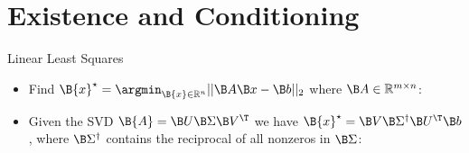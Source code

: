 
%

\subtitle{Linear Least Squares}
\date{}


\begin{frame}
  \titlepage
\end{frame}

\section{Existence and Conditioning}

\begin{frame}[fragile]{Linear Least Squares}
\begin{itemize}
\item Find $\B{x}^\star= \argmin_{\B{x}\in\mathbb{R}^{n}}||\B A \B x - \B b||_2$ where $\B A \in\mathbb{R}^{m\times n}$:


\item Given the SVD $\B{A}=\B U \B \Sigma \B V^\T$ we have $\B{x}^\star = \B V \B \Sigma^{\dagger}\B U^\T \B b$, where $\B \Sigma^{\dagger}$ contains the reciprocal of all nonzeros in $\B \Sigma$:


\end{itemize}
\end{frame}
